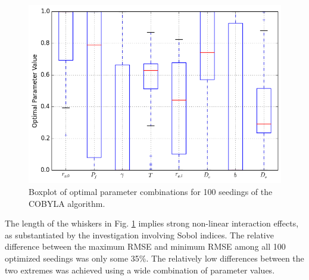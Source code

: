 \begin{figure}[!h]
\caption{\label{fig:optimal_params_boxplot}
Boxplot of optimal parameter combinations for 100 seedings of the \ac{COBYLA} algorithm.}
 \begin{center}
  \includegraphics[scale=.75]{./Chapter4/optimal_params_boxplot.png}
 \end{center}
\end{figure}
The length of the whiskers in Fig. \ref{fig:optimal_params_boxplot} implies strong non-linear interaction effects, as substantiated by the investigation involving Sobol indices. The relative difference between the maximum \ac{RMSE} and minimum \ac{RMSE} among all 100 optimized seedings was only some 35\%. The relatively low differences between the two extremes was achieved using a wide combination of parameter values.  

